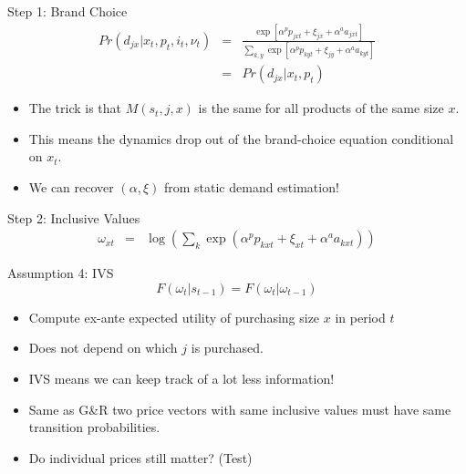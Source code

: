 \begin{frame}{Step 1: Brand Choice}
\begin{eqnarray*}
Pr(d_{jx} | x_t, p_t,i_t,\nu_t) &=& \frac{\exp[\alpha^p p_{jxt} + \xi_{jx} + \alpha^a a_{jxt}]}{\sum_{k,y} \exp[\alpha^p p_{kyt} + \xi_{jy} + \alpha^a a_{kyt}  ] }\\
&=&Pr(d_{jx} | x_t, p_t)
\end{eqnarray*}
\begin{itemize}
\item The trick is that $M(s_t,j,x)$ is the same for all products of the same size $x$.
\item This means the dynamics drop out of the brand-choice equation conditional on $x_t$.
\item We can recover $(\alpha, \xi)$ from static demand estimation!
\end{itemize}
\end{frame}

\begin{frame}{Step 2: Inclusive Values}
\begin{eqnarray*}
\omega_{xt} &=& \log \left( \sum_k \exp(\alpha^p p_{kxt} + \xi_{xt} + \alpha^a a_{kxt}) \right)
\end{eqnarray*}
\vspace{-0.5cm}
\begin{block}{Assumption 4: IVS}
$$F(\omega_t | s_{t-1}) = F(\omega_t | \omega_{t-1})$$
\end{block}
\begin{itemize}
\item Compute ex-ante expected utility of purchasing size $x$ in period $t$
\item Does not depend on which $j$ is purchased.
\item IVS means we can keep track of a lot less information!
\item Same as G\&R two price vectors with same inclusive values must have same transition probabilities.
\item Do individual prices still matter? (Test)
\end{itemize}
\end{frame}


